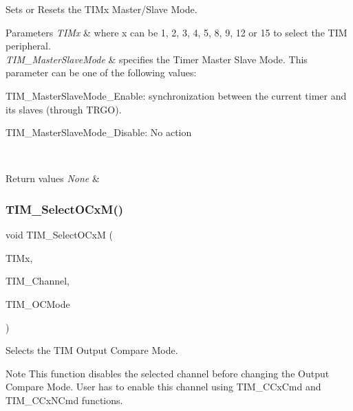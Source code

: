 Sets or Resets the T\+I\+Mx Master/\+Slave Mode. 


\begin{DoxyParams}{Parameters}
{\em T\+I\+Mx} & where x can be 1, 2, 3, 4, 5, 8, 9, 12 or 15 to select the T\+IM peripheral. \\
\hline
{\em T\+I\+M\+\_\+\+Master\+Slave\+Mode} & specifies the Timer Master Slave Mode. This parameter can be one of the following values\+: \begin{DoxyItemize}
\item T\+I\+M\+\_\+\+Master\+Slave\+Mode\+\_\+\+Enable\+: synchronization between the current timer and its slaves (through T\+R\+GO). \item T\+I\+M\+\_\+\+Master\+Slave\+Mode\+\_\+\+Disable\+: No action \end{DoxyItemize}
\\
\hline
\end{DoxyParams}

\begin{DoxyRetVals}{Return values}
{\em None} & \\
\hline
\end{DoxyRetVals}
\mbox{\label{group___t_i_m___exported___functions_ga83ea0af5a7c1af521236ce5e4d2c42b0}} 
\subsubsection{\texorpdfstring{TIM\_SelectOCxM()}{TIM\_SelectOCxM()}}
{\footnotesize\ttfamily void T\+I\+M\+\_\+\+Select\+O\+CxM (\begin{DoxyParamCaption}\item[{\mbox{\hyperlink{struct_t_i_m___type_def}{T\+I\+M\+\_\+\+Type\+Def}} $\ast$}]{T\+I\+Mx,  }\item[{uint16\+\_\+t}]{T\+I\+M\+\_\+\+Channel,  }\item[{uint16\+\_\+t}]{T\+I\+M\+\_\+\+O\+C\+Mode }\end{DoxyParamCaption})}



Selects the T\+IM Output Compare Mode. 

\begin{DoxyNote}{Note}
This function disables the selected channel before changing the Output Compare Mode. User has to enable this channel using T\+I\+M\+\_\+\+C\+Cx\+Cmd and T\+I\+M\+\_\+\+C\+Cx\+N\+Cmd functions. 
\end{DoxyNote}

